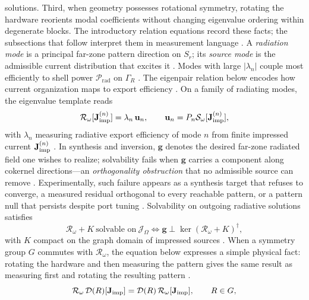 solutions. Third, when geometry possesses rotational symmetry, rotating the hardware reorients
modal coefficients without changing eigenvalue ordering within degenerate blocks. The introductory relation
equations record these facts; the subsections that follow interpret them in measurement
language \cite{stratton1941}.
A \emph{radiation mode} is a principal far-zone pattern direction on $S_r$; its \emph{source mode}
is the admissible current distribution that excites it \cite{harrington2001}. Modes with large
$|\lambda_n|$ couple most efficiently to shell power $\mathcal{P}_{\mathrm{rad}}$ on $\Gamma_R$
\cite{stratton1941}. The eigenpair relation below encodes how current organization maps to export
efficiency \cite{collin2001}. On a family of radiating modes, the eigenvalue template reads
\begin{equation}
\label{eq:ch2.modal-eigenvalue-equation}
\mathcal{R}_\omega[\mathbf{J}_{\mathrm{imp}}^{(n)}]=\lambda_n\,\mathbf{u}_n,
\qquad
\mathbf{u}_n=P_n\mathcal{S}_\omega[\mathbf{J}_{\mathrm{imp}}^{(n)}],
\end{equation}
with \(\lambda_n\) measuring radiative export efficiency of mode \(n\) from finite impressed
current \(\mathbf{J}_{\mathrm{imp}}^{(n)}\) \cite{stratton1941}. In synthesis and inversion, $\mathbf{g}$ denotes the
desired far-zone radiated field one wishes to realize; solvability fails when $\mathbf{g}$ carries
a component along cokernel directions---an \emph{orthogonality obstruction} that no admissible
source can remove \cite{stratton1941}. Experimentally, such failure appears as a synthesis target
that refuses to converge, a measured residual orthogonal to every reachable pattern, or a
pattern null that persists despite port tuning \cite{harrington2001}. Solvability on outgoing radiative solutions satisfies
\begin{equation}
\label{eq:ch2.spectral-solvability}
\mathcal{R}_\omega+K
\ \text{solvable on}\ \mathcal{J}_\Omega
\iff
\mathbf{g}\perp\ker(\mathcal{R}_\omega+K)^{\dagger},
\end{equation}
with \(K\) compact on the graph domain of impressed sources \cite{stratton1941}.
When a symmetry group \(G\) commutes with \(\mathcal{R}_\omega\), the equation below expresses
a simple physical fact: rotating the hardware and then measuring the pattern gives the same
result as measuring first and rotating the resulting pattern \cite{harrington2001}.
\begin{equation}
\label{eq:ch2.degeneracy-covariance}
\mathcal{R}_\omega\,\mathcal{D}(R)[\mathbf{J}_{\mathrm{imp}}]
=
\mathcal{D}(R)\,\mathcal{R}_\omega[\mathbf{J}_{\mathrm{imp}}],
\qquad R\in G,
\end{equation}
